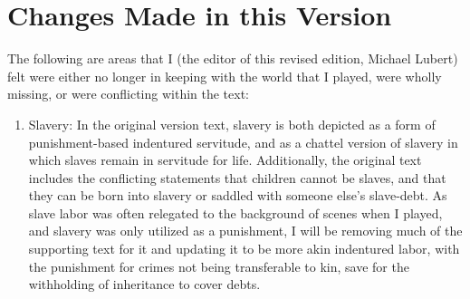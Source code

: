 \chapter{Changes Made in this Version}
\label{ch:changes}
The following are areas that I (the editor of this revised edition, Michael Lubert) felt were either no longer in keeping with the world that I played, were wholly missing, or were conflicting within the text:
\begin{enumerate}[leftmargin=12pt]
\item Slavery: In the original version text, slavery is both depicted as a form of punishment-based indentured servitude, and as a chattel version of slavery in which slaves remain in servitude for life. Additionally, the original text includes the conflicting statements that children cannot be slaves, and that they can be born into slavery or saddled with someone else's slave-debt. As slave labor was often relegated to the background of scenes when I played, and slavery was only utilized as a punishment, I will be removing much of the supporting text for it and updating it to be more akin indentured labor, with the punishment for crimes not being transferable to kin, save for the withholding of inheritance to cover debts. 


\end{enumerate}
